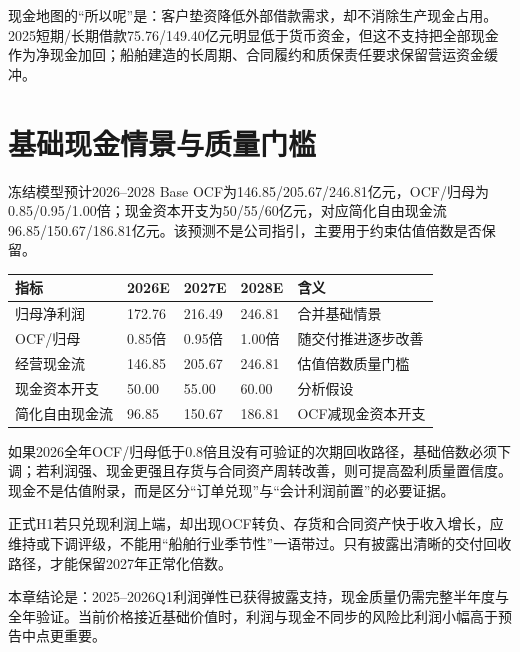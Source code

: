现金地图的“所以呢”是：客户垫资降低外部借款需求，却不消除生产现金占用。2025短期/长期借款75.76/149.40亿元明显低于货币资金，但这不支持把全部现金作为净现金加回；船舶建造的长周期、合同履约和质保责任要求保留营运资金缓冲。

\section{基础现金情景与质量门槛}

冻结模型预计2026--2028 Base OCF为146.85/205.67/246.81亿元，OCF/归母为0.85/0.95/1.00倍；现金资本开支为50/55/60亿元，对应简化自由现金流96.85/150.67/186.81亿元。该预测不是公司指引，主要用于约束估值倍数是否保留。

\begin{exhibitbox}[Base现金转化路径]
\small
\begin{tabularx}{\exhibitboxwidth}{L{3.4cm}R{2.6cm}R{2.6cm}R{2.6cm}X}
\toprule
\textbf{指标} & \textbf{2026E} & \textbf{2027E} & \textbf{2028E} & \textbf{含义} \\
\midrule
归母净利润 & 172.76 & 216.49 & 246.81 & 合并基础情景 \\
OCF/归母 & 0.85倍 & 0.95倍 & 1.00倍 & 随交付推进逐步改善 \\
经营现金流 & 146.85 & 205.67 & 246.81 & 估值倍数质量门槛 \\
现金资本开支 & 50.00 & 55.00 & 60.00 & 分析假设 \\
简化自由现金流 & 96.85 & 150.67 & 186.81 & OCF减现金资本开支 \\
\bottomrule
\end{tabularx}
\end{exhibitbox}

如果2026全年OCF/归母低于0.8倍且没有可验证的次期回收路径，基础倍数必须下调；若利润强、现金更强且存货与合同资产周转改善，则可提高盈利质量置信度。现金不是估值附录，而是区分“订单兑现”与“会计利润前置”的必要证据。

\begin{riskbox}[半年报现金检查]
正式H1若只兑现利润上端，却出现OCF转负、存货和合同资产快于收入增长，应维持或下调评级，不能用“船舶行业季节性”一语带过。只有披露出清晰的交付回收路径，才能保留2027年正常化倍数。
\end{riskbox}

本章结论是：2025--2026Q1利润弹性已获得披露支持，现金质量仍需完整半年度与全年验证。当前价格接近基础价值时，利润与现金不同步的风险比利润小幅高于预告中点更重要。
